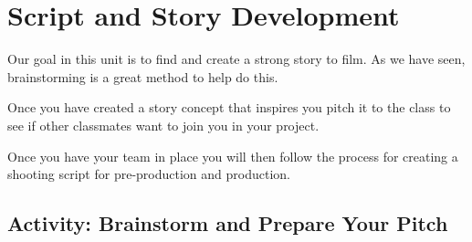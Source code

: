 \documentclass[
  letterpaper,
  DIV=11,
  numbers=noendperiod]{scrreprt}
\begin{document}
\section{Script and Story
Development}\label{script-and-story-development}

Our goal in this unit is to find and create a strong story to film. As
we have seen, brainstorming is a great method to help do this.

Once you have created a story concept that inspires you pitch it to the
class to see if other classmates want to join you in your project.

Once you have your team in place you will then follow the process for
creating a shooting script for pre-production and production.

\subsection{Activity: Brainstorm and Prepare Your
Pitch}\label{activity-brainstorm-and-prepare-your-pitch}
\end{document}
